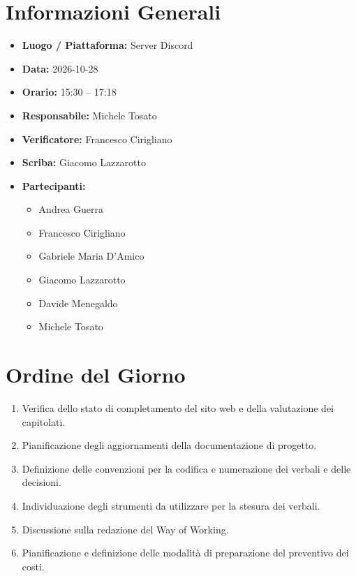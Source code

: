 \documentclass[11pt, a4paper]{article}
\newcommand{\DocDate}{2026-10-28}
\begin{document}
\section{Informazioni Generali}
\begin{itemize}
    \item \textbf{Luogo / Piattaforma:} Server Discord
    \item \textbf{Data:} \DocDate
    \item \textbf{Orario:} 15:30 -- 17:18
    \item \textbf{Responsabile:} Michele Tosato
    \item \textbf{Verificatore:} Francesco Cirigliano
    \item \textbf{Scriba:} Giacomo Lazzarotto
    \item \textbf{Partecipanti:}
        \begin{itemize}
            \item Andrea Guerra
            \item Francesco Cirigliano
            \item Gabriele Maria D'Amico
            \item Giacomo Lazzarotto
            \item Davide Menegaldo
            \item Michele Tosato
        \end{itemize}
\end{itemize}
\clearpage






\section{Ordine del Giorno}
\begin{enumerate}
    \item Verifica dello stato di completamento del sito web e della valutazione dei capitolati.
    \item Pianificazione degli aggiornamenti della documentazione di progetto.
    \item Definizione delle convenzioni per la codifica e numerazione dei verbali e delle decisioni.
    \item Individuazione degli strumenti da utilizzare per la stesura dei verbali.
    \item Discussione sulla redazione del Way of Working.
    \item Pianificazione e definizione delle modalità di preparazione del preventivo dei costi.
\end{enumerate}
\end{document}

